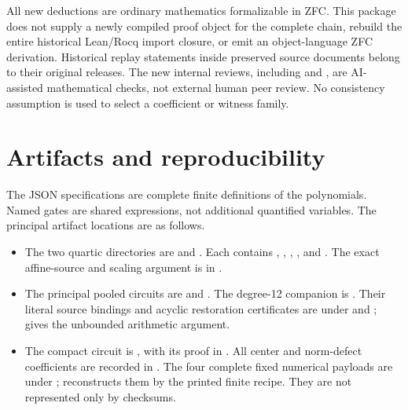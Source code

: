 All new deductions are ordinary mathematics formalizable in ZFC.  This
package does not supply a newly compiled proof object for the complete
chain, rebuild the entire historical Lean/Rocq import closure, or emit an
object-language ZFC derivation.  Historical replay statements inside
preserved source documents belong to their original releases.  The new
internal reviews, including
 and
, are AI-assisted mathematical
checks, not external human peer review.  No consistency assumption is
used to select a coefficient or witness family.

\section{Artifacts and reproducibility}
\label{sec:reproduce}

The JSON specifications are complete finite definitions of the
polynomials.  Named gates are shared expressions, not additional
quantified variables.  The principal artifact locations are as follows.
\begin{itemize}
\item The two quartic directories are
   and
  .
  Each contains ,
  , ,
  , and .
  The exact affine-source and scaling argument is in
  .
\item The principal pooled circuits are
   and
  .
  The degree-12 companion is
  .
  Their literal source bindings and acyclic restoration certificates are
  under  and ;
   gives the unbounded arithmetic argument.
\item The compact circuit is , with its proof
  in .  All center and norm-defect coefficients are
  recorded in .
  The four complete fixed numerical payloads are under
  ;
   reconstructs them by the
  printed finite recipe.  They are not represented only by checksums.
\end{itemize}

